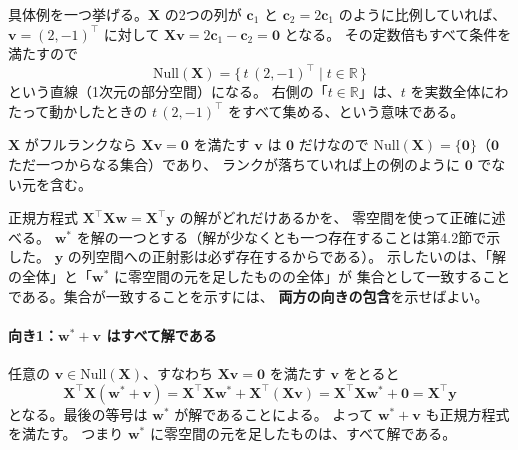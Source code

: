 具体例を一つ挙げる。$\bm{X}$ の2つの列が $\bm{c}_1$ と $\bm{c}_2 = 2\bm{c}_1$ のように比例していれば、
$\bm{v} = (2, -1)^\top$ に対して $\bm{X}\bm{v} = 2\bm{c}_1 - \bm{c}_2 = \bm{0}$ となる。
その定数倍もすべて条件を満たすので
\begin{equation*}
  \mathrm{Null}(\bm{X}) = \{\, t\,(2, -1)^\top \mid t \in \mathbb{R} \,\}
\end{equation*}
という直線（1次元の部分空間）になる。
右側の「$t \in \mathbb{R}$」は、$t$ を実数全体にわたって動かしたときの
$t\,(2,-1)^\top$ をすべて集める、という意味である。

$\bm{X}$ がフルランクなら $\bm{X}\bm{v} = \bm{0}$ を満たす $\bm{v}$ は $\bm{0}$ だけなので
$\mathrm{Null}(\bm{X}) = \{\bm{0}\}$（$\bm{0}$ ただ一つからなる集合）であり、
ランクが落ちていれば上の例のように $\bm{0}$ でない元を含む。

正規方程式 $\bm{X}^\top\bm{X}\bm{w} = \bm{X}^\top\bm{y}$ の解がどれだけあるかを、
零空間を使って正確に述べる。
$\bm{w}^*$ を解の一つとする（解が少なくとも一つ存在することは第4.2節で示した。
$\bm{y}$ の列空間への正射影は必ず存在するからである）。
示したいのは、「解の全体」と「$\bm{w}^*$ に零空間の元を足したものの全体」が
集合として一致することである。集合が一致することを示すには、
\textbf{両方の向きの包含}を示せばよい。

\paragraph{向き1：$\bm{w}^* + \bm{v}$ はすべて解である}
任意の $\bm{v} \in \mathrm{Null}(\bm{X})$、すなわち $\bm{X}\bm{v} = \bm{0}$ を満たす $\bm{v}$ をとると
\begin{equation*}
  \bm{X}^\top\bm{X}(\bm{w}^* + \bm{v}) = \bm{X}^\top\bm{X}\bm{w}^* + \bm{X}^\top(\bm{X}\bm{v})
   = \bm{X}^\top\bm{X}\bm{w}^* + \bm{0} = \bm{X}^\top\bm{y}
\end{equation*}
となる。最後の等号は $\bm{w}^*$ が解であることによる。
よって $\bm{w}^* + \bm{v}$ も正規方程式を満たす。
つまり $\bm{w}^*$ に零空間の元を足したものは、すべて解である。

